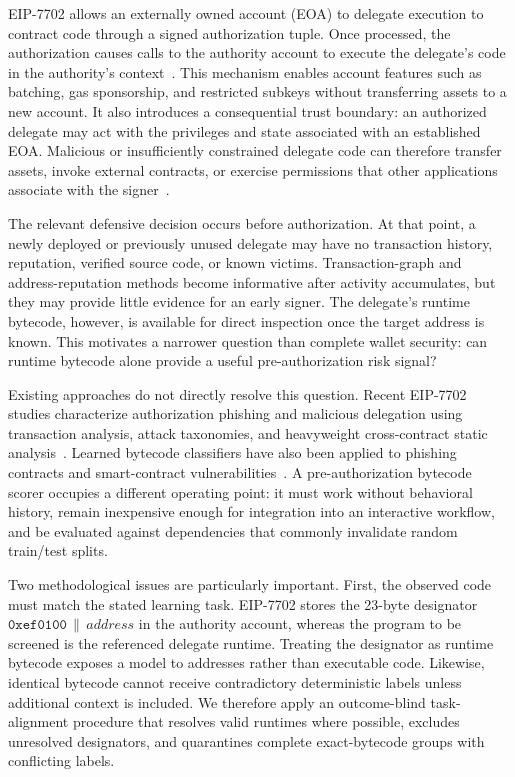 \documentclass[conference]{IEEEtran}
\begin{document}
EIP-7702 allows an externally owned account (EOA) to delegate execution to contract code through a signed authorization tuple. Once processed, the authorization causes calls to the authority account to execute the delegate's code in the authority's context~\cite{eip7702}. This mechanism enables account features such as batching, gas sponsorship, and restricted subkeys without transferring assets to a new account. It also introduces a consequential trust boundary: an authorized delegate may act with the privileges and state associated with an established EOA. Malicious or insufficiently constrained delegate code can therefore transfer assets, invoke external contracts, or exercise permissions that other applications associate with the signer~\cite{eip7702,qi2025eip7702phishing,huang2026darkside}.

The relevant defensive decision occurs before authorization. At that point, a newly deployed or previously unused delegate may have no transaction history, reputation, verified source code, or known victims. Transaction-graph and address-reputation methods become informative after activity accumulates, but they may provide little evidence for an early signer. The delegate's runtime bytecode, however, is available for direct inspection once the target address is known. This motivates a narrower question than complete wallet security: can runtime bytecode alone provide a useful pre-authorization risk signal?

Existing approaches do not directly resolve this question. Recent EIP-7702 studies characterize authorization phishing and malicious delegation using transaction analysis, attack taxonomies, and heavyweight cross-contract static analysis~\cite{qi2025eip7702phishing,huang2026darkside}. Learned bytecode classifiers have also been applied to phishing contracts and smart-contract vulnerabilities~\cite{derosa2025phishinghook,wang2021contractward}. A pre-authorization bytecode scorer occupies a different operating point: it must work without behavioral history, remain inexpensive enough for integration into an interactive workflow, and be evaluated against dependencies that commonly invalidate random train/test splits.

Two methodological issues are particularly important. First, the observed code must match the stated learning task. EIP-7702 stores the 23-byte designator $\mathtt{0xef0100}\,\|\,\textit{address}$ in the authority account, whereas the program to be screened is the referenced delegate runtime. Treating the designator as runtime bytecode exposes a model to addresses rather than executable code. Likewise, identical bytecode cannot receive contradictory deterministic labels unless additional context is included. We therefore apply an outcome-blind task-alignment procedure that resolves valid runtimes where possible, excludes unresolved designators, and quarantines complete exact-bytecode groups with conflicting labels.
\end{document}
